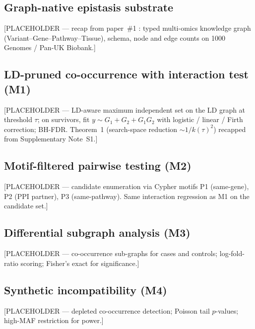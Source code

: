 
\subsection{Graph-native epistasis substrate}\label{sec:methods_substrate}

[PLACEHOLDER --- recap from paper~\#1 \cite{estaji2026graphgwas}: typed
multi-omics knowledge graph (Variant--Gene--Pathway--Tissue), schema,
node and edge counts on 1000 Genomes / Pan-UK Biobank.]

\subsection{LD-pruned co-occurrence with interaction test (M1)}\label{sec:methods_m1}

[PLACEHOLDER --- LD-aware maximum independent set on the LD graph at
threshold $\tau$; on survivors, fit $y \sim G_{1} + G_{2} + G_{1}G_{2}$
with logistic / linear / Firth correction; BH-FDR. Theorem~1
(search-space reduction $\sim 1/k(\tau)^{2}$) recapped from
\cite{estaji2026graphgwas} Supplementary Note~S1.]

\subsection{Motif-filtered pairwise testing (M2)}\label{sec:methods_m2}

[PLACEHOLDER --- candidate enumeration via Cypher motifs P1
(same-gene), P2 (PPI partner), P3 (same-pathway). Same interaction
regression as M1 on the candidate set.]

\subsection{Differential subgraph analysis (M3)}\label{sec:methods_m3}

[PLACEHOLDER --- co-occurrence sub-graphs for cases and controls;
log-fold-ratio scoring; Fisher's exact for significance.]

\subsection{Synthetic incompatibility (M4)}\label{sec:methods_m4}

[PLACEHOLDER --- depleted co-occurrence detection; Poisson tail
$p$-values; high-MAF restriction for power.]


